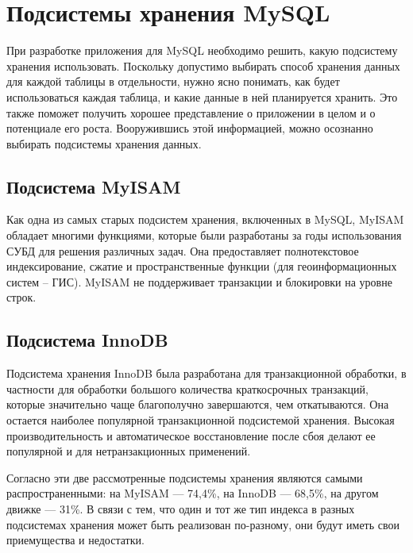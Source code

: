 \section{Подсистемы хранения MySQL}

При разработке приложения для MySQL необходимо решить, какую подсистему хранения использовать. Поскольку допустимо выбирать способ хранения данных для каждой таблицы в отдельности, нужно ясно понимать, как будет использоваться каждая таблица, и какие данные в ней планируется хранить. Это также поможет получить хорошее представление о приложении в целом и о потенциале его роста. Вооружившись этой информацией, можно осознанно выбирать  подсистемы хранения данных.


\subsection{Подсистема MyISAM}

Как одна из самых старых подсистем хранения, включенных в MySQL, MyISAM обладает многими функциями, которые были разработаны за годы использования СУБД для решения различных задач. Она предоставляет полнотекстовое индексирование, сжатие и пространственные функции (для геоинформационных систем – ГИС). MyISAM не поддерживает транзакции и блокировки на уровне строк.


\subsection{Подсистема InnoDB}

Подсистема хранения InnoDB была разработана для транзакционной обработки, в частности для обработки большого количества краткосрочных транзакций, которые значительно чаще благополучно завершаются, чем откатываются. Она остается наиболее популярной транзакционной подсистемой хранения. Высокая производительность и автоматическое восстановление после сбоя делают ее популярной и для нетранзакционных применений.

\indent

Согласно \cite{tagline.ru:List_DBMS} эти две рассмотренные подсистемы хранения являются самыми распространенными: на MyISAM — 74,4\%, на InnoDB — 68,5\%, на другом движке — 31\%. В связи с тем, что один и тот же тип индекса в разных подсистемах хранения может быть реализован по-разному, они будут иметь свои приемущества и недостатки. \cite[p.~137]{zaitsev}



